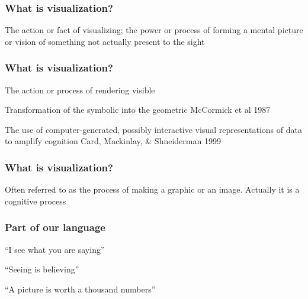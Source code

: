 \documentclass[12pt]{beamer}\usepackage[]{graphicx}\usepackage[]{color}
\begin{document}
\begin{frame}
\frametitle{What is visualization?}

The action or fact of visualizing; the power or process of forming
a mental picture or vision of something not actually present to the sight
\eb

\end{frame}


\begin{frame}
\frametitle{What is visualization?}

\bbi
  \item The action or process of rendering visible
  \item Transformation of the symbolic into the geometric 
  {\lolit McCormick et al 1987}
  \item The use of computer-generated, possibly interactive visual 
  representations of data to amplify cognition {\lolit Card, Mackinlay, \& Shneiderman 1999}
\ei
\eb

\end{frame}


\begin{frame}
\frametitle{What is visualization?}

Often referred to as the process of making a graphic or an image.
Actually it is a cognitive process
\eb

\end{frame}


\begin{frame}
\frametitle{Part of our language}

\bbi
  \item ``I see what you are saying''
  \item ``Seeing is believing''
  \item ``A picture is worth a thousand numbers''
\ei

\end{frame}

\end{document}
